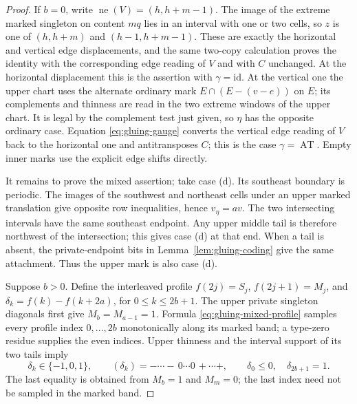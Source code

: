 \documentclass[11pt,a4paper]{amsart}
\numberwithin{equation}{section}
\theoremstyle{plain}
\theoremstyle{definition}
\begin{document}
\begin{proof}
If \(b=0\), write \(\operatorname{ne}(V)=(h,h+m-1)\).  The image of the extreme marked singleton on content \(mq\) lies in an interval with one or two cells, so \(z\) is one of
\((h,h+m)\) and \((h-1,h+m-1)\).  These are exactly the horizontal and vertical edge displacements, and the same two-copy calculation proves the identity with the corresponding edge reading of \(V\) and with \(C\) unchanged.  At the horizontal displacement this is the assertion with \(\gamma=\mathrm{id}\).  At the vertical one the upper chart uses the alternate ordinary mark \(E\cap(E-(v-e))\) on \(E\); its complements and thinness are read in the two extreme windows of the upper chart.  It is legal by the complement test just given, so \(\eta\) has the opposite ordinary case.  Equation \eqref{eq:gluing-gauge} converts the vertical edge reading of \(V\) back to the horizontal one and antitransposes \(C\); this is the case \(\gamma=\operatorname{AT}\).  Empty inner marks use the explicit edge shifts directly.

It remains to prove the mixed assertion; take case (d).  Its southeast boundary is periodic.  The images of the southwest and northeast cells under an upper marked translation give opposite row inequalities, hence \(v_\eta=av\).  The two intersecting intervals have the same southeast endpoint.  Any upper middle tail is therefore northwest of the intersection; this gives case (d) at that end.  When a tail is absent, the private-endpoint bits in Lemma~\ref{lem:gluing-coding} give the same attachment.  Thus the upper mark is also case (d).

Suppose \(b>0\).  Define the interleaved profile \(f(2j)=S_j\), \(f(2j+1)=M_j\), and
\(\delta_k=f(k)-f(k+2a)\), for \(0\le k\le2b+1\).
The upper private singleton diagonals first give \(M_b=M_{a-1}=1\).  Formula \eqref{eq:gluing-mixed-profile} samples every profile index \(0,\ldots,2b\) monotonically along its marked band; a type-zero residue supplies the even indices.  Upper thinness and the interval support of its two tails imply
\begin{equation}\label{eq:gluing-walk-signs}
 \delta_k\in\{-1,0,1\},\qquad
 (\delta_k)=-\cdots-\,0\cdots0\,+\cdots+,
 \qquad \delta_0\le0,\quad\delta_{2b+1}=1.
\end{equation}
The last equality is obtained from \(M_b=1\) and \(M_m=0\); the last index need not be sampled in the marked band.


\end{proof}
\end{document}

